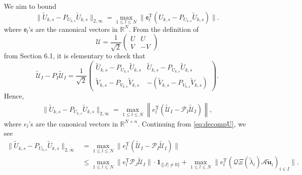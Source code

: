 \documentclass[reqno]{amsart}
\newcommand{\T}{\mathrm{T}}
\theoremstyle{plain}
\theoremstyle{definition}
\begin{document}
We aim to bound $$\|\widetilde U_{k,s}-P_{U_{k,s}}\widetilde U_{k,s}\|_{2,\infty} =\max_{1\le l \le N} \| \mathsf{e}_l^\T (U_{k,s}-P_{U_{k,s}}\widetilde U_{k,s})\|.$$ where $\mathsf{e}_l$'s are the canonical vectors in $\mathbb R^N$. From the definition of 
$$\mathcal U=\frac{1}{\sqrt 2} \begin{pmatrix}
U & U\\
V & -V
\end{pmatrix}
$$ from Section 6.1, it is elementary to check that %
$$\widetilde{\mathcal U}_I - P_I \widetilde{\mathcal U}_I  = \frac{1}{\sqrt 2} \begin{pmatrix}
\widetilde U_{k,s}-P_{U_{k,s}}\widetilde U_{k,s} &\widetilde U_{k,s}-P_{U_{k,s}}\widetilde U_{k,s}\\
\widetilde V_{k,s}-P_{V_{k,s}}\widetilde V_{k,s} & -(\widetilde V_{k,s}-P_{V_{k,s}}\widetilde V_{k,s})
\end{pmatrix}.$$ Hence,
\begin{align*}
\|\widetilde U_{k,s}-P_{U_{k,s}}\widetilde U_{k,s}\|_{2,\infty}= \max_{1\le l \le N}\left\|e_l^\T \left(\widetilde{\mathcal U}_I - \mathcal P_I \widetilde{\mathcal U}_I \right) \right\|, 
\end{align*}
where $e_l$'s are the canonical vectors in $\mathbb R^{N+n}$. Continuing from \eqref{eq:decompU}, we see
\begin{align}\label{eq:infbd}
\|\widetilde U_{k,s}-P_{U_{k,s}}\widetilde U_{k,s}\|_{2,\infty} &= \max_{1\le l \le N} \|e_l^\T \left(\widetilde{\mathcal U}_I - \mathcal P_I \widetilde{\mathcal U}_I \right)\| \nonumber\\
&\le \max_{1\le l \le N} \|e_l^\T \mathcal P_J \widetilde{\mathcal U}_I\|\cdot \mathbf{1}_{\{ |J|\neq 0 \}}+ \max_{1\le l \le N} \|e_l^\T (\mathcal Q \Xi(\widetilde \lambda_i) \mathcal A \widetilde{\mathbf u}_i)_{i\in I}\|.
\end{align}
\end{document}
